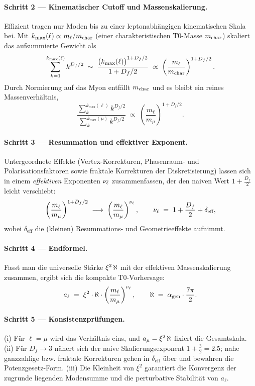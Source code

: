 \documentclass[12pt,a4paper]{article}
\begin{document}
	\paragraph{Schritt 2 — Kinematischer Cutoff und Massenskalierung.}
	Effizient tragen nur Moden bis zu einer leptonabhängigen kinematischen Skala bei. Mit $k_{\max}(\ell)\propto m_\ell/m_{\mathrm{char}}$ (einer charakteristischen T0-Masse $m_{\mathrm{char}}$) skaliert das aufsummierte Gewicht als
	\[
	\sum_{k=1}^{k_{\max}(\ell)} k^{D_f/2} \;\sim\; \frac{ \big(k_{\max}(\ell)\big)^{1+D_f/2} }{1+D_f/2}
	\;\propto\; \left(\frac{m_\ell}{m_{\mathrm{char}}}\right)^{1+D_f/2}.
	\]
	Durch Normierung auf das Myon entfällt $m_{\mathrm{char}}$ und es bleibt ein reines Massenverhältnis,
	\[
	\frac{\sum_k^{k_{\max}(\ell)} k^{D_f/2}}{\sum_k^{k_{\max}(\mu)} k^{D_f/2}}
	\;\propto\; \left(\frac{m_\ell}{m_\mu}\right)^{1+D_f/2}.
	\]
	
	\paragraph{Schritt 3 — Resummation und effektiver Exponent.}
	Untergeordnete Effekte (Vertex-Korrekturen, Phasenraum- und Polarisationsfaktoren sowie fraktale Korrekturen der Diskretisierung) lassen sich in einem \emph{effektiven} Exponenten $\nu_{\ell}$ zusammenfassen, der den naiven Wert $1+\tfrac{D_f}{2}$ leicht verschiebt:
	\[
	\left(\frac{m_\ell}{m_\mu}\right)^{1+D_f/2} 
	\;\longrightarrow\; 
	\left(\frac{m_\ell}{m_\mu}\right)^{\nu_{\ell}},
	\qquad
	\nu_{\ell} \;=\; 1+\frac{D_f}{2}+\delta_\text{eff},
	\]
	wobei $\delta_\text{eff}$ die (kleinen) Resummations- und Geometrieeffekte aufnimmt.
	
	\paragraph{Schritt 4 — Endformel.}
	Fasst man die universelle Stärke $\xi^2\,\aleph$ mit der effektiven Massenskalierung zusammen, ergibt sich die kompakte T0-Vorhersage:
	\[
	a_\ell \;=\; \xi^2 \cdot \aleph \cdot \left(\frac{m_\ell}{m_\mu}\right)^{\nu_{\ell}},
	\qquad
	\aleph \;=\; \alpha_{\mathrm{gen}} \cdot \frac{7\pi}{2}.
	\]
	
	\paragraph{Schritt 5 — Konsistenzprüfungen.}
	(i) Für $\ell=\mu$ wird das Verhältnis eins, und $a_\mu=\xi^2\,\aleph$ fixiert die Gesamtskala.  
	(ii) Für $D_f\to 3$ nähert sich der naive Skalierungsexponent $1+\tfrac{3}{2}=2.5$; nahe ganzzahlige bzw. fraktale Korrekturen gehen in $\delta_\text{eff}$ über und bewahren die Potenzgesetz-Form.  
	(iii) Die Kleinheit von $\xi^2$ garantiert die Konvergenz der zugrunde liegenden Modensumme und die perturbative Stabilität von $a_\ell$.
	
\end{document}
